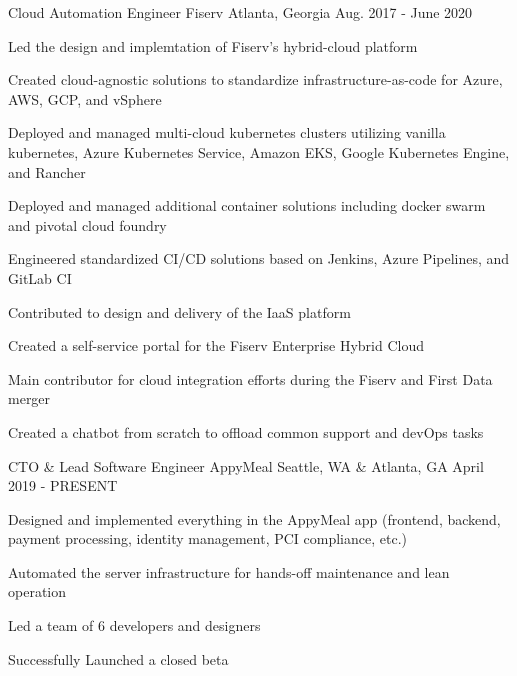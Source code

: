 \begin{cventries}

\cventry
{Cloud Automation Engineer} %
{Fiserv} %
{Atlanta, Georgia} %
{Aug. 2017 - June 2020} %
{ %
\begin{cvitems}
\item {Led the design and implemtation of Fiserv's hybrid-cloud platform}
\item {Created cloud-agnostic solutions to standardize infrastructure-as-code for Azure, AWS, GCP, and vSphere}
\item {Deployed and managed multi-cloud kubernetes clusters utilizing vanilla kubernetes, Azure Kubernetes Service, Amazon EKS, Google Kubernetes Engine, and Rancher}
\item {Deployed and managed additional container solutions including docker swarm and pivotal cloud foundry}
\item {Engineered standardized CI/CD solutions based on Jenkins, Azure Pipelines, and GitLab CI}
\item {Contributed to design and delivery of the IaaS platform}
\item {Created a self-service portal for the Fiserv Enterprise Hybrid Cloud}
\item {Main contributor for cloud integration efforts during the Fiserv and First Data merger}
\item {Created a chatbot from scratch to offload common support and devOps tasks}
\end{cvitems}
}


\cventry
{CTO \& Lead Software Engineer} %
{AppyMeal} %
{Seattle, WA \& Atlanta, GA} %
{April 2019 - PRESENT} %
{ %
\begin{cvitems}
\item {Designed and implemented everything in the AppyMeal app (frontend, backend, payment processing, \newline identity management, PCI compliance, etc.)}
\item {Automated the server infrastructure for hands-off maintenance and lean operation}
\item {Led a team of 6 developers and designers}
\item {Successfully Launched a closed beta}
\end{cvitems}
}


\end{cventries}
